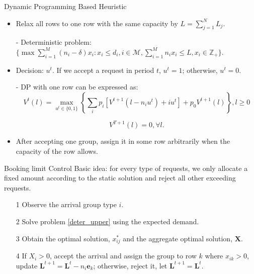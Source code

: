       \begin{frame}{Dynamic Programming Based Heuristic}
        \begin{itemize}
        \item Relax all rows to one row with the same capacity by $L = \sum_{j=1}^{N} L_j$.
        \item[-] Deterministic problem: $\{\max \sum_{i=1}^{M} (n_i- \delta) x_{i}: x_{i} \leq d_{i}, i \in \mathcal{M}, \sum_{i=1}^{M} n_{i} x_{i} \leq L, x_{i} \in \mathbb{Z}_{+}\}$.
        \item Decision: $u^{t}$. If we accept a request in period $t$, $u^t = 1$; otherwise, $u^t =0$.  
        \item[-] DP with one row can be expressed as:
        $$V^{t}(l) =  \max_{u^{t} \in \{0,1\}} \left\{ \sum_{i} p_i [V^{t+1}(l-n_i u^{t})+ i u^{t}] + p_0 V^{t+1}(l)\right\}, l \geq 0 $$

        $$V^{T+1}(l) =0, \forall l.$$
        \item After accepting one group, assign it in some row arbitrarily when the capacity of the row allows.
        \end{itemize}
      \end{frame}
      
      \begin{frame}{Booking limit Control}
        Basic idea: for every type of requests, we only allocate a fixed amount according to the static solution and reject all other exceeding requests.
        \begin{itemize}
          \item[1] Observe the arrival group type $i$.
          \item[2] Solve problem \eqref{deter_upper} using the expected demand.
          \item[3] Obtain the optimal solution, $x_{ij}^{*}$ and the aggregate optimal solution, $\mathbf{X}$.
          \item[4] If $X_{i} > 0$, accept the arrival and assign the group to row $k$ where $x_{ik} > 0$, update $\mathbf{L}^{t+1} = \mathbf{L}^{t} - n_i \mathbf{e}_{k}$; otherwise, reject it, let $\mathbf{L}^{t+1} = \mathbf{L}^{t}$.
        \end{itemize}
                 
      \end{frame}